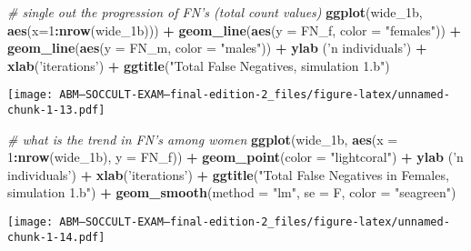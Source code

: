 \documentclass[]{article}
\newenvironment{Shaded}{\begin{snugshade}}{\end{snugshade}}
\newcommand{\KeywordTok}[1]{\textcolor[rgb]{0.13,0.29,0.53}{\textbf{#1}}}
\newcommand{\DataTypeTok}[1]{\textcolor[rgb]{0.13,0.29,0.53}{#1}}
\newcommand{\DecValTok}[1]{\textcolor[rgb]{0.00,0.00,0.81}{#1}}
\newcommand{\StringTok}[1]{\textcolor[rgb]{0.31,0.60,0.02}{#1}}
\newcommand{\CommentTok}[1]{\textcolor[rgb]{0.56,0.35,0.01}{\textit{#1}}}
\newcommand{\OperatorTok}[1]{\textcolor[rgb]{0.81,0.36,0.00}{\textbf{#1}}}
\newcommand{\NormalTok}[1]{#1}
\begin{document}
\begin{Shaded}
\begin{Highlighting}[]
\CommentTok{# single out the progression of FN's (total count values)}
\KeywordTok{ggplot}\NormalTok{(wide_1b, }\KeywordTok{aes}\NormalTok{(}\DataTypeTok{x=}\DecValTok{1}\OperatorTok{:}\KeywordTok{nrow}\NormalTok{(wide_1b))) }\OperatorTok{+}\StringTok{ }
\StringTok{  }\KeywordTok{geom_line}\NormalTok{(}\KeywordTok{aes}\NormalTok{(}\DataTypeTok{y =}\NormalTok{ FN_f, }\DataTypeTok{color =} \StringTok{"females"}\NormalTok{)) }\OperatorTok{+}
\StringTok{  }\KeywordTok{geom_line}\NormalTok{(}\KeywordTok{aes}\NormalTok{(}\DataTypeTok{y =}\NormalTok{ FN_m, }\DataTypeTok{color =} \StringTok{"males"}\NormalTok{)) }\OperatorTok{+}
\StringTok{  }\KeywordTok{ylab}\NormalTok{ (}\StringTok{'n individuals'}\NormalTok{) }\OperatorTok{+}\StringTok{ }\KeywordTok{xlab}\NormalTok{(}\StringTok{'iterations'}\NormalTok{) }\OperatorTok{+}
\StringTok{  }\KeywordTok{ggtitle}\NormalTok{(}\StringTok{"Total False Negatives, simulation 1.b"}\NormalTok{)}
\end{Highlighting}
\end{Shaded}

\texttt{[image: ABM---SOCCULT-EXAM---final-edition-2\_files/figure-latex/unnamed-chunk-1-13.pdf]}

\begin{Shaded}
\begin{Highlighting}[]
\CommentTok{# what is the trend in FN's among women}
\KeywordTok{ggplot}\NormalTok{(wide_1b, }\KeywordTok{aes}\NormalTok{(}\DataTypeTok{x =} \DecValTok{1}\OperatorTok{:}\KeywordTok{nrow}\NormalTok{(wide_1b), }\DataTypeTok{y =}\NormalTok{ FN_f)) }\OperatorTok{+}\StringTok{ }
\StringTok{  }\KeywordTok{geom_point}\NormalTok{(}\DataTypeTok{color =} \StringTok{"lightcoral"}\NormalTok{) }\OperatorTok{+}
\StringTok{  }\KeywordTok{ylab}\NormalTok{ (}\StringTok{'n individuals'}\NormalTok{) }\OperatorTok{+}\StringTok{ }\KeywordTok{xlab}\NormalTok{(}\StringTok{'iterations'}\NormalTok{) }\OperatorTok{+}
\StringTok{  }\KeywordTok{ggtitle}\NormalTok{(}\StringTok{"Total False Negatives in Females, simulation 1.b"}\NormalTok{) }\OperatorTok{+}
\StringTok{  }\KeywordTok{geom_smooth}\NormalTok{(}\DataTypeTok{method =} \StringTok{"lm"}\NormalTok{, }\DataTypeTok{se =}\NormalTok{ F, }\DataTypeTok{color =} \StringTok{"seagreen"}\NormalTok{)}
\end{Highlighting}
\end{Shaded}

\texttt{[image: ABM---SOCCULT-EXAM---final-edition-2\_files/figure-latex/unnamed-chunk-1-14.pdf]}
\end{document}
